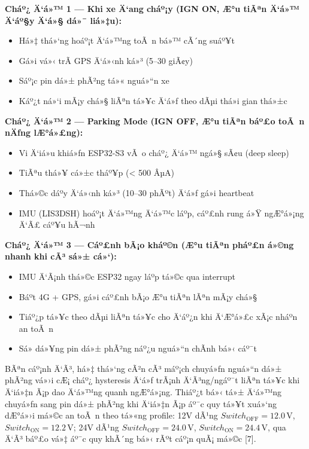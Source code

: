 \documentclass[a4paper]{extarticle}
\providecommand{\tightlist}{%
  \setlength{\itemsep}{0pt}\setlength{\parskip}{0pt}}
\begin{document}
\textbf{Cháº¿ Ä‘á»™ 1 --- Khi xe Ä‘ang cháº¡y (IGN ON, Æ°u tiÃªn Ä‘á»™ Ä‘áº§y Ä‘á»§ dá»¯ liá»‡u):}

\begin{itemize}
\tightlist
\item
  Há»‡ thá»‘ng hoáº¡t Ä‘á»™ng toÃ n bá»™ cÃ´ng suáº¥t
\item
  Gá»­i vá»‹ trÃ­ GPS Ä‘á»‹nh ká»³ (5--30 giÃ¢y)
\item
  Sáº¡c pin dá»± phÃ²ng tá»« nguá»“n xe
\item
  Káº¿t ná»‘i mÃ¡y chá»§ liÃªn tá»¥c Ä‘á»ƒ theo dÃµi thá»i gian thá»±c
\end{itemize}

\textbf{Cháº¿ Ä‘á»™ 2 --- Parking Mode (IGN OFF, Æ°u tiÃªn báº£o toÃ n nÄƒng lÆ°á»£ng):}

\begin{itemize}
\tightlist
\item
  Vi Ä‘iá»u khiá»ƒn ESP32-S3 vÃ o cháº¿ Ä‘á»™ ngá»§ sÃ¢u (deep sleep)
\item
  TiÃªu thá»¥ cá»±c tháº¥p (\textless{} 500 ÂµA)
\item
  Thá»©c dáº­y Ä‘á»‹nh ká»³ (10--30 phÃºt) Ä‘á»ƒ gá»­i heartbeat
\item
  IMU (LIS3DSH) hoáº¡t Ä‘á»™ng Ä‘á»™c láº­p, cáº£nh rung á»Ÿ ngÆ°á»¡ng Ä‘Ã£ cáº¥u hÃ¬nh
\end{itemize}

\textbf{Cháº¿ Ä‘á»™ 3 --- Cáº£nh bÃ¡o kháº©n (Æ°u tiÃªn pháº£n á»©ng nhanh khi cÃ³ sá»± cá»‘):}

\begin{itemize}
\tightlist
\item
  IMU Ä‘Ã¡nh thá»©c ESP32 ngay láº­p tá»©c qua interrupt
\item
  Báº­t 4G + GPS, gá»­i cáº£nh bÃ¡o Æ°u tiÃªn lÃªn mÃ¡y chá»§
\item
  Tiáº¿p tá»¥c theo dÃµi liÃªn tá»¥c cho Ä‘áº¿n khi Ä‘Æ°á»£c xÃ¡c nháº­n an toÃ n
\item
  Sá»­ dá»¥ng pin dá»± phÃ²ng náº¿u nguá»“n chÃ­nh bá»‹ cáº¯t
\end{itemize}

BÃªn cáº¡nh Ä‘Ã³, há»‡ thá»‘ng cÃ²n cÃ³ máº¡ch chuyá»ƒn nguá»“n dá»± phÃ²ng vá»›i cÆ¡ cháº¿
hysteresis Ä‘á»ƒ trÃ¡nh Ä‘Ã³ng/ngáº¯t liÃªn tá»¥c khi Ä‘iá»‡n Ã¡p dao Ä‘á»™ng quanh ngÆ°á»¡ng.
Thiáº¿t bá»‹ tá»± Ä‘á»™ng chuyá»ƒn sang pin dá»± phÃ²ng khi Ä‘iá»‡n Ã¡p áº¯c quy tá»¥t xuá»‘ng
dÆ°á»›i má»©c an toÃ n theo tá»«ng profile: 12V dÃ¹ng
\(Switch_{\mathrm{OFF}} = 12.0\,\mathrm{V}\), \(Switch_{\mathrm{ON}} = 12.2\,\mathrm{V}\);
24V dÃ¹ng \(Switch_{\mathrm{OFF}} = 24.0\,\mathrm{V}\),
\(Switch_{\mathrm{ON}} = 24.4\,\mathrm{V}\), qua Ä‘Ã³ báº£o vá»‡ áº¯c quy khÃ´ng bá»‹ rÃºt
cáº¡n quÃ¡ má»©c {[}7{]}.
\end{document}
